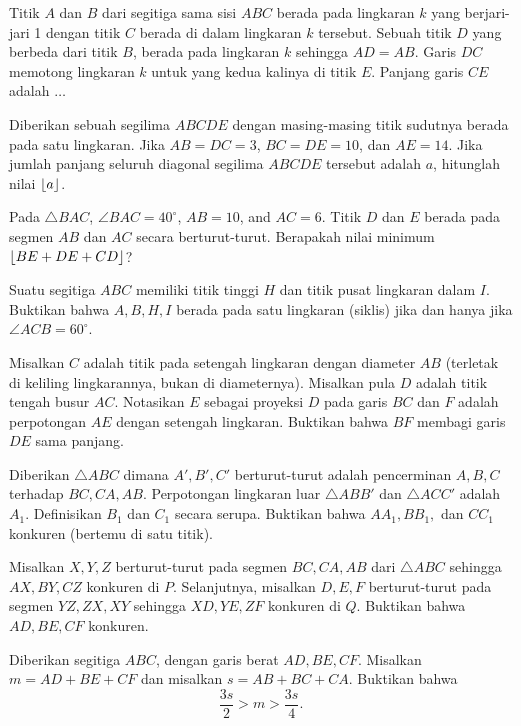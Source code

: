 \documentclass[12pt]{scrartcl}
\begin{document}
	\begin{soalbaru}
		Titik $A$ dan $B$ dari segitiga sama sisi $ABC$ berada pada lingkaran $k$ yang berjari-jari 1 dengan titik $C$ berada di dalam lingkaran $k$ tersebut. Sebuah titik $D$ yang berbeda dari titik $B$, berada pada lingkaran $k$ sehingga $AD=AB$. Garis $DC$ memotong lingkaran $k$ untuk yang kedua kalinya di titik $E$. Panjang garis $CE$ adalah $\dots$ %
	\end{soalbaru}

	\begin{soalbaru}
		Diberikan sebuah segilima $ABCDE$ dengan masing-masing titik sudutnya berada pada satu lingkaran. Jika $AB=DC=3$, $BC=DE=10$, dan $AE=14$. Jika jumlah panjang seluruh diagonal segilima $ABCDE$ tersebut adalah $a$, hitunglah nilai $\left\lfloor a \right\rfloor$.
	\end{soalbaru}
	
	\begin{soalbaru}
		Pada $\triangle BAC$, $\angle BAC = 40^\circ$, $AB=10$, and $AC=6$. Titik $D$ dan $E$ berada pada segmen $AB$ dan $AC$ secara berturut-turut. Berapakah nilai minimum $\left\lfloor BE+DE+CD \right\rfloor$?
	\end{soalbaru}
	
	\begin{soalbaru} 
		Suatu segitiga $ABC$ memiliki titik tinggi $H$ dan titik pusat lingkaran dalam $I$. Buktikan bahwa $A,B,H,I$ berada pada satu lingkaran (siklis) jika dan hanya jika $\angle ACB = 60^\circ$.
	\end{soalbaru}
	
	\begin{soalbaru} 
		 Misalkan $C$ adalah titik pada setengah lingkaran dengan diameter $AB$ (terletak di keliling lingkarannya, bukan di diameternya). Misalkan pula $D$ adalah titik tengah busur $AC$. Notasikan $E$ sebagai proyeksi $D$ pada garis $BC$ dan $F$ adalah perpotongan $AE$ dengan setengah lingkaran. Buktikan bahwa $BF$ membagi garis $DE$ sama panjang.
	\end{soalbaru}
	
	\begin{soalbaru} 
		Diberikan $\triangle ABC$ dimana $A',B',C'$ berturut-turut adalah pencerminan $A,B,C$ terhadap $BC,CA,AB$. Perpotongan lingkaran luar $\triangle ABB'$ dan $\triangle ACC'$ adalah $A_1$. Definisikan $B_1$ dan $C_1$ secara serupa. Buktikan bahwa $AA_1,BB_1,$ dan $CC_1$ konkuren (bertemu di satu titik).
	\end{soalbaru}
	
	\begin{soalbaru}
		Misalkan $X,Y,Z$ berturut-turut pada segmen $BC,CA,AB$ dari $\triangle ABC$ sehingga $AX, BY, CZ$ konkuren di $P$. Selanjutnya, misalkan $D,E,F$ berturut-turut pada segmen $YZ,ZX,XY$ sehingga $XD,YE,ZF$ konkuren di $Q$. Buktikan bahwa $AD,BE,CF$ konkuren.
	\end{soalbaru}
	
	\begin{soalbaru}
		Diberikan segitiga $ABC$, dengan garis berat $AD, BE, CF$. Misalkan $m=AD+BE+CF$ dan misalkan $s=AB+BC+CA$. Buktikan bahwa $$\dfrac{3s}{2} > m > \dfrac{3s}{4}.$$
	\end{soalbaru}
	
\end{document}
